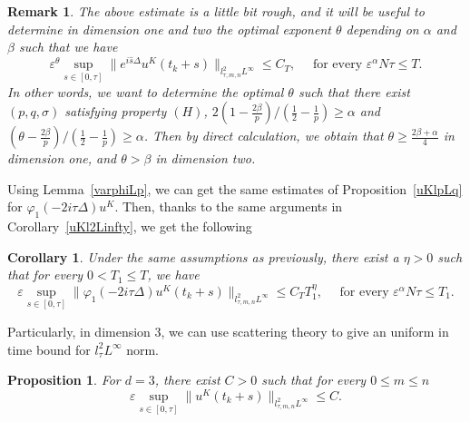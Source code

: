 \documentclass[10pt,a4paper]{article}
\newtheorem{corollary}[theorem]{Corollary}
\newtheorem{proposition}[theorem]{Proposition}
\newtheorem{remark}[theorem]{Remark}
\begin{document}
  \begin{remark}\label{remuKl2Linfty}
    The above estimate is a little bit rough, and it will be useful to determine 
    in dimension one and two the optimal exponent \(\theta\) depending on \(\alpha\) 
    and \(\beta\)  such that we have
    \[ \varepsilon^\theta \sup_{s\in[0,\tau]} \|e^{i\hat{s}\Delta}u^K(t_k+s)\|_{l^2_{\tau,m,n}L^\infty} 
    \leq C_T, \quad \text{ for every } \varepsilon^\alpha N \tau \leq T. \]
    In other words, we want to determine the optimal \(\theta\) such that there
    exist \((p,q,\sigma)\) satisfying property \((H)\), 
    \(2(1-\frac{2\beta}p)/(\frac12-\frac1p) \geq \alpha\) and 
    \((\theta-\frac{2\beta}p)/(\frac12-\frac1p) \geq \alpha\). Then by direct
    calculation, we obtain that \(\theta\geq \frac{2\beta+\alpha}4\) in dimension
    one, and \(\theta > \beta \) in dimension two.
  \end{remark}

  Using Lemma~\ref{varphiLp}, we can get the same estimates of Proposition~\ref{uKlpLq} 
  for \(\varphi_1(-2i\tau\Delta)u^K\). Then, thanks to the same arguments in
  Corollary~\ref{uKl2Linfty}, we get the following

  \begin{corollary}\label{phiuKlpLq}
    Under the same assumptions as previously, there exist
    a \(\eta>0\) such that for every \(0< T_1 \leq T\), we have 
    \[ \varepsilon \sup_{s\in[0,\tau]} \|\varphi_1(-2i\tau\Delta)u^K(t_k+s)\|_{l^2_{\tau,m,n}L^\infty} 
    \leq C_T T_1^\eta, \quad \text{ for every } \varepsilon^\alpha N \tau \leq T_1. \]
  \end{corollary}

  Particularly, in dimension 3, we can use scattering theory to give an uniform
  in time bound for \(l^2_\tau L^\infty\) norm. 

  \begin{proposition}\label{uKl2Linftyd3}
    For \(d=3\), there exist \(C>0\) such that for every \(0\leq m\leq n\)
    \[ \varepsilon \sup_{s\in[0,\tau]} \|u^K(t_k+s)\|_{l^2_{\tau,m,n}L^\infty} 
    \leq C. \]
  \end{proposition}
\end{document}
